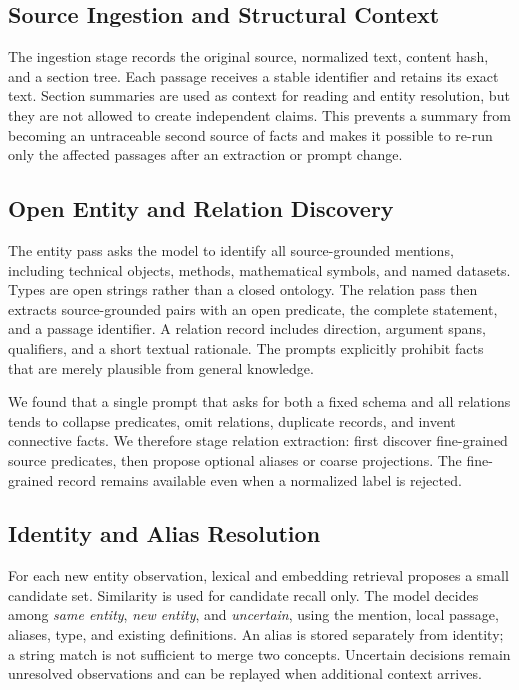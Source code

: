 \documentclass[11pt]{article}
\begin{document}
\subsection{Source Ingestion and Structural Context}

The ingestion stage records the original source, normalized text, content hash, and a section tree. Each passage receives a stable identifier and retains its exact text. Section summaries are used as context for reading and entity resolution, but they are not allowed to create independent claims. This prevents a summary from becoming an untraceable second source of facts and makes it possible to re-run only the affected passages after an extraction or prompt change.

\subsection{Open Entity and Relation Discovery}

The entity pass asks the model to identify all source-grounded mentions, including technical objects, methods, mathematical symbols, and named datasets. Types are open strings rather than a closed ontology. The relation pass then extracts source-grounded pairs with an open predicate, the complete statement, and a passage identifier. A relation record includes direction, argument spans, qualifiers, and a short textual rationale. The prompts explicitly prohibit facts that are merely plausible from general knowledge.

We found that a single prompt that asks for both a fixed schema and all relations tends to collapse predicates, omit relations, duplicate records, and invent connective facts. We therefore stage relation extraction: first discover fine-grained source predicates, then propose optional aliases or coarse projections. The fine-grained record remains available even when a normalized label is rejected.

\subsection{Identity and Alias Resolution}

For each new entity observation, lexical and embedding retrieval proposes a small candidate set. Similarity is used for candidate recall only. The model decides among \emph{same entity}, \emph{new entity}, and \emph{uncertain}, using the mention, local passage, aliases, type, and existing definitions. An alias is stored separately from identity; a string match is not sufficient to merge two concepts. Uncertain decisions remain unresolved observations and can be replayed when additional context arrives.
\end{document}
